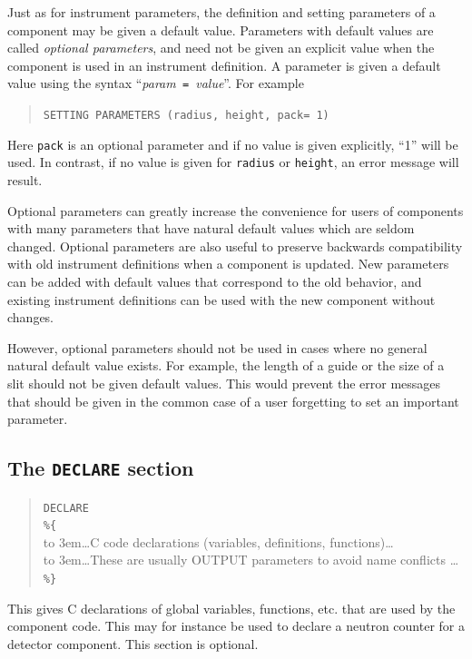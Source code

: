 Just as for instrument parameters, the definition and setting parameters of a
component may be given a default value. Parameters with default values are
called \emph{optional parameters}, and need not be given an explicit value when
the component is used in an instrument definition. A parameter is given a
default value using the syntax ``\textit{param}\texttt{ = }\textit{value}''.
For example
\begin{quote}
  \texttt{SETTING PARAMETERS (radius, height, pack= 1)}
\end{quote}
Here \verb+pack+ is an optional parameter and if no value is given
explicitly, ``1'' will be used. In contrast, if no value is
  given for \texttt{radius} or \texttt{height}, an error message will
  result.

Optional parameters can greatly increase the convenience for users of
components with many parameters that have natural default values which
are seldom changed. Optional parameters are also useful to preserve
backwards compatibility with old instrument definitions when a component
is updated. New parameters can be added with default values that
correspond to the old behavior, and existing instrument definitions can
be used with the new component without changes.

However, optional parameters should not be used in cases where no
general natural default value exists. For example, the length of a guide
or the size of a slit should not be given default values. This would
prevent the error messages that should be given in the common case of a
user forgetting to set an important parameter.


\subsection{The \texttt{DECLARE} section}
\label{s:comp-declare}
\begin{quote}
  \texttt{DECLARE} \\
  \verb|%{| \\
  \hbox to 3em{}\ldots C code declarations (variables, definitions, functions)\ldots \\
  \hbox to 3em{}\ldots These are usually OUTPUT parameters to avoid name conflicts \ldots \\
  \verb|%}|
\end{quote}
This gives C declarations of global variables, functions, etc. that are used by the
component code. This may for instance be used to declare a neutron
counter for a detector component. This section is optional.


